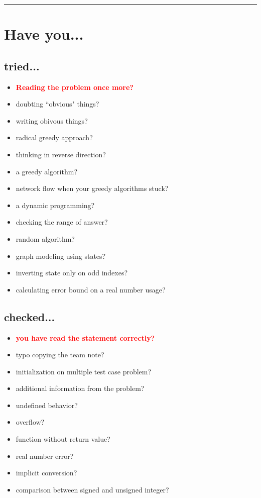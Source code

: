 \documentclass[landscape, 8pt, a4paper, oneside]{extarticle}
\begin{document}
\begin{multicols}{3}

\maketitlepage

\par\noindent\rule{\columnwidth}{0.4pt}

\section{Have you...}

\subsection{tried...}

\begin{itemize}
    \item \textcolor{red}{\textbf{Reading the problem once more?}}
    \item doubting ``obvious" things?
    \item writing obivous things?
    \item radical greedy approach?
    \item thinking in reverse direction?
    \item a greedy algorithm?
    \item network flow when your greedy algorithms stuck?
    \item a dynamic programming?
    \item checking the range of answer?
    \item random algorithm?
    \item graph modeling using states?
    \item inverting state only on odd indexes?
    \item calculating error bound on a real number usage?
\end{itemize}

\subsection{checked...}

\begin{itemize}
    \item \textcolor{red}{\textbf{you have read the statement correctly?}}
    \item typo copying the team note?
    \item initialization on multiple test case problem?
    \item additional information from the problem?
    \item undefined behavior?
    \item overflow?
    \item function without return value?
    \item real number error?
    \item implicit conversion?
    \item comparison between signed and unsigned integer?
\end{itemize}


\end{multicols}
\end{document}

